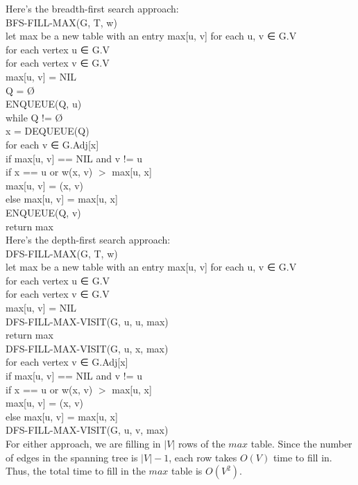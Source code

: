 \documentclass[10pt,letterpaper]{article}
\begin{document}
\begin{itemize}
Here's the breadth-first search approach:\\
BFS-FILL-MAX(G, T, w)\\
    let max be a new table with an entry max[u, v] for each u, v ∈ G.V\\
    for each vertex u ∈ G.V\\
        for each vertex v ∈ G.V\\
            max[u, v] = NIL\\
        Q = Ø\\
        ENQUEUE(Q, u)\\
        while Q != Ø\\
            x = DEQUEUE(Q)\\
            for each v ∈ G.Adj[x]\\
                if max[u, v] == NIL and v != u\\
                    if x == u or w(x, v) $>$ max[u, x]\\
                        max[u, v] = (x, v)\\
                    else max[u, v] = max[u, x]\\
                    ENQUEUE(Q, v)\\
    return max\\
    
Here's the depth-first search approach:\\
DFS-FILL-MAX(G, T, w)\\
    let max be a new table with an entry max[u, v] for each u, v ∈ G.V\\
    for each vertex u ∈ G.V\\
        for each vertex v ∈ G.V\\
            max[u, v] = NIL\\
        DFS-FILL-MAX-VISIT(G, u, u, max)\\
    return max\\
DFS-FILL-MAX-VISIT(G, u, x, max)\\
    for each vertex v ∈ G.Adj[x]\\
        if max[u, v] == NIL and v != u\\
            if x == u or w(x, v) $>$ max[u, x]\\
                max[u, v] = (x, v)\\
            else max[u, v] = max[u, x]\\
            DFS-FILL-MAX-VISIT(G, u, v, max)\\

For either approach, we are filling in $|V|$ rows of the $max$ table. Since the number of edges in the spanning tree is $|V| - 1$, each row takes $O(V)$ time to fill in. Thus, the total time to fill in the $max$ table is $O(V^2)$.


\end{itemize}
\end{document}
